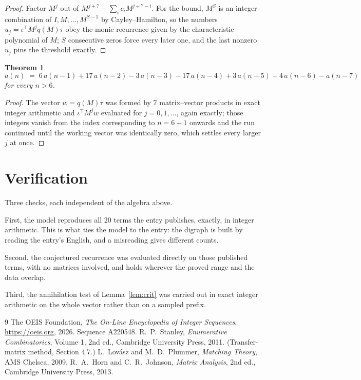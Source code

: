 \documentclass[11pt,a4paper]{article}
\theoremstyle{plain}
\newtheorem{theorem}{Theorem}
\theoremstyle{definition}
\begin{document}
\begin{proof}
Factor $M^{j}$ out of $M^{j+7}-\sum_ic_iM^{j+7-i}$. For the bound, $M^{S}$
is an integer combination of $I,M,\dots,M^{S-1}$ by Cayley--Hamilton, so the numbers
$u_j=\iota^{\!\top}M^{j}q(M)\tau$ obey the monic recurrence given by the characteristic
polynomial of $M$; $S$ consecutive zeros force every later one, and the last nonzero $u_j$
pins the threshold exactly.
\end{proof}

\begin{theorem}
\[
a(n)\;=\;6\,a(n-1) + 17\,a(n-2) - 3\,a(n-3) - 17\,a(n-4) + 3\,a(n-5) + 4\,a(n-6) - a(n-7)
\]
for every $n>6$.
\end{theorem}

\begin{proof}
The vector $w=q(M)\tau$ was formed by $7$ matrix--vector products in exact integer
arithmetic and $\iota^{\!\top}M^{j}w$ evaluated for $j=0,1,\dots$, again exactly; those
integers vanish from the index corresponding to $n=6+1$ onwards and the run continued
until the working vector was identically zero, which settles every larger $j$ at once.
\end{proof}

\section{Verification}

Three checks, each independent of the algebra above.

First, the model reproduces all $20$ terms the entry publishes, exactly, in integer
arithmetic. This is what ties the model to the entry: the digraph is built by reading the
entry's English, and a misreading gives different counts.

Second, the conjectured recurrence was evaluated directly on those published terms, with no
matrices involved, and holds wherever the proved range and the data overlap.

Third, the annihilation test of Lemma~\ref{lem:crit} was carried out in exact integer
arithmetic on the whole vector rather than on a sampled prefix.

\begin{thebibliography}{9}
 The OEIS Foundation, \emph{The On-Line Encyclopedia of Integer
Sequences}, \url{https://oeis.org}, 2026. Sequence A220548.
 R.~P.~Stanley, \emph{Enumerative Combinatorics}, Volume 1, 2nd ed.,
Cambridge University Press, 2011. (Transfer-matrix method, Section 4.7.)
 L.~Lov\'asz and M.~D.~Plummer, \emph{Matching Theory}, AMS Chelsea,
2009.
 R.~A.~Horn and C.~R.~Johnson, \emph{Matrix Analysis}, 2nd ed., Cambridge
University Press, 2013.
\end{thebibliography}
\end{document}
